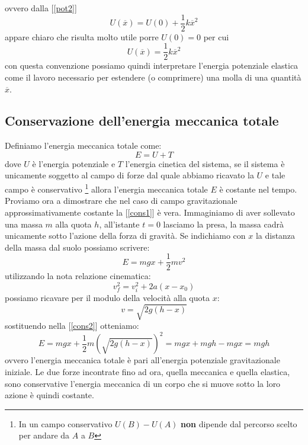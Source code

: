 \documentclass[a4paper,10pt,oneside]{article}
\begin{document}
ovvero dalla [\ref{pot2}]
\begin{equation}
 U(\overline x)=U(0)+\frac 1 2 k\overline x^2
\end{equation}
appare chiaro che risulta molto utile porre $U(0)=0$ per cui
\begin{equation}
 U(\overline x)=\frac 1 2 k\overline x^2
\end{equation}
con questa convenzione possiamo quindi interpretare l'energia potenziale elastica come il lavoro necessario per estendere (o comprimere) una molla di una quantità $\overline x$.

\subsection*{Conservazione dell'energia meccanica totale}
Definiamo l'energia meccanica totale come:
\begin{equation}\label{cons1}
 E=U+T
\end{equation}
dove $U$ è l'energia potenziale e $T$ l'energia cinetica del sistema, se il sistema è unicamente soggetto al campo di forze dal quale abbiamo ricavato la $U$ e tale campo è conservativo \footnote{In un campo conservativo $U(B)-U(A)$ \textbf{non} dipende dal percorso scelto per andare da $A$ a $B$} allora l'energia meccanica totale $E$ è costante nel tempo.
Proviamo ora a dimostrare che nel caso di campo gravitazionale approssimativamente costante  la [\ref{cons1}] è vera. Immaginiamo di aver sollevato una massa $m$ alla quota $h$, all'istante $t=0$ lasciamo la presa, la massa cadrà unicamente sotto l'azione della forza di gravità. Se indichiamo con $x$ la distanza della massa dal suolo possiamo scrivere:
\begin{equation}\label{cons2}
 E=mgx+\frac 1 2 mv^2
\end{equation}
utilizzando la nota relazione cinematica:
\begin{equation}
 v_f^2=v_i^2+2a(x-x_0)
\end{equation}
possiamo ricavare per il modulo della velocità alla quota $x$:
\begin{equation}
 v=\sqrt{2g(h-x)}
\end{equation}
sostituendo nella [\ref{cons2}] otteniamo:
\begin{equation}
  E=mgx+\frac 1 2 m (\sqrt{2g(h-x)})^2=mgx+mgh-mgx=mgh
\end{equation}
ovvero l'energia meccanica totale è pari all'energia potenziale gravitazionale iniziale. Le due forze incontrate fino ad ora, quella meccanica e quella elastica, sono conservative l'energia meccanica di un corpo che si muove sotto la loro azione è quindi costante.
\end{document}
